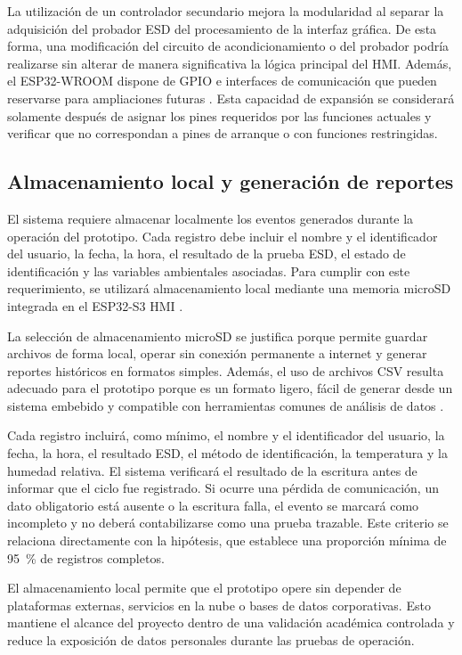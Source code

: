 La utilización de un controlador secundario mejora la modularidad al separar la
adquisición del probador ESD del procesamiento de la interfaz gráfica. De esta
forma, una modificación del circuito de acondicionamiento o del probador podría
realizarse sin alterar de manera significativa la lógica principal del HMI.
Además, el ESP32-WROOM dispone de GPIO e interfaces de comunicación que pueden
reservarse para ampliaciones futuras \cite{esp32wroom}. Esta capacidad de
expansión se considerará solamente después de asignar los pines requeridos por
las funciones actuales y verificar que no correspondan a pines de arranque o
con funciones restringidas.

\subsection{Almacenamiento local y generación de reportes}

El sistema requiere almacenar localmente los eventos generados durante la
operación del prototipo. Cada registro debe incluir el nombre y el identificador
del usuario, la fecha, la hora, el resultado de la prueba ESD, el estado de
identificación y las variables ambientales asociadas. Para cumplir con este requerimiento, se
utilizará almacenamiento local mediante una memoria microSD integrada en el
ESP32-S3 HMI \cite{ElecrowESP32HMIManual}.

La selección de almacenamiento microSD se justifica porque permite guardar
archivos de forma local, operar sin conexión permanente a internet y generar
reportes históricos en formatos simples. Además, el uso de archivos CSV resulta
adecuado para el prototipo porque es un formato ligero, fácil de generar desde
un sistema embebido y compatible con herramientas comunes de análisis de datos
\cite{RFC4180}.

Cada registro incluirá, como mínimo, el nombre y el identificador del usuario,
la fecha, la hora, el resultado ESD, el método de identificación, la temperatura
y la humedad relativa. El
sistema verificará el resultado de la escritura antes de informar que el ciclo
fue registrado. Si ocurre una pérdida de comunicación, un dato obligatorio está
ausente o la escritura falla, el evento se marcará como incompleto y no deberá
contabilizarse como una prueba trazable. Este criterio se relaciona directamente
con la hipótesis, que establece una proporción mínima de 95~\% de registros
completos.

El almacenamiento local permite que el prototipo opere sin depender de
plataformas externas, servicios en la nube o bases de datos corporativas. Esto
mantiene el alcance del proyecto dentro de una validación académica controlada y
reduce la exposición de datos personales durante las pruebas de operación.

